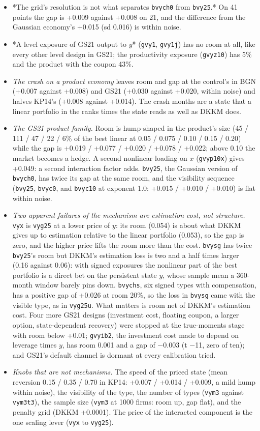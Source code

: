 \documentclass[11pt]{article}
\begin{document}
\begin{itemize}
\item *The grid's resolution is not what separates \texttt{bvych0} from \texttt{bvy25}.* On 41 points the gap is +0.009 against +0.008 on 21, and the difference from the Gaussian economy's +0.015 (sd 0.016) is within noise.
\item *A level exposure of GS21 output to $y$* (\texttt{gvy1}, \texttt{gvy1j}) has no room at all, like every other level design in GS21; the productivity exposure (\texttt{gvyz10}) has 5\% and the product with the coupon 43\%.
\item \emph{The crash on a product economy} leaves room and gap at the control's in BGN (+0.007 against +0.008) and GS21 (+0.030 against +0.020, within noise) and halves KP14's (+0.008 against +0.014). The crash months are a state that a linear portfolio in the ranks times the state reads as well as DKKM does.
\item \emph{The GS21 product family.} Room is hump-shaped in the product's size (45 / 111 / 47 / 22 / 6\% of the best linear at 0.05 / 0.075 / 0.10 / 0.15 / 0.20) while the gap is +0.019 / +0.077 / +0.020 / +0.078 / +0.022; above 0.10 the market becomes a hedge. A second nonlinear loading on $x$ (\texttt{gvyp10x}) gives +0.049: a second interaction factor adds. \texttt{bvy25}, the Gaussian version of \texttt{bvych0}, has twice its gap at the same room, and the visibility sequence (\texttt{bvy25}, \texttt{bvyc0}, and \texttt{bvyc10} at exponent 1.0: +0.015 / +0.010 / +0.010) is flat within noise.
\item \emph{Two apparent failures of the mechanism are estimation cost, not structure.} \texttt{vyx} is \texttt{vyg25} at a lower price of $y$: its room (0.054) is about what DKKM gives up to estimation relative to the linear portfolio (0.053), so the gap is zero, and the higher price lifts the room more than the cost. \texttt{bvysg} has twice \texttt{bvy25}'s room but DKKM's estimation loss is two and a half times larger (0.16 against 0.06): with signed exposures the nonlinear part of the best portfolio is a direct bet on the persistent state $y$, whose sample mean a 360-month window barely pins down. \texttt{bvychs}, six signed types with compensation, has a positive gap of +0.026 at room 20\%, so the loss in \texttt{bvysg} came with the visible type, as in \texttt{vyg25u}. What matters is room net of DKKM's estimation cost. Four more GS21 designs (investment cost, floating coupon, a larger option, state-dependent recovery) were stopped at the true-moments stage with room below +0.01; \texttt{gvyib2}, the investment cost made to depend on leverage times $y$, has room 0.001 and a gap of $-$0.003 (t $-$11, zero of ten); and GS21's default channel is dormant at every calibration tried.
\item \emph{Knobs that are not mechanisms.} The speed of the priced state (mean reversion 0.15 / 0.35 / 0.70 in KP14: +0.007 / +0.014 / +0.009, a mild hump within noise), the visibility of the type, the number of types (\texttt{vym3} against \texttt{vym3t3}), the sample size (\texttt{vym3} at 1000 firms: room up, gap flat), and the penalty grid (DKKM +0.0001). The price of the interacted component is the one scaling lever (\texttt{vyx} to \texttt{vyg25}).
\end{itemize}
\end{document}
